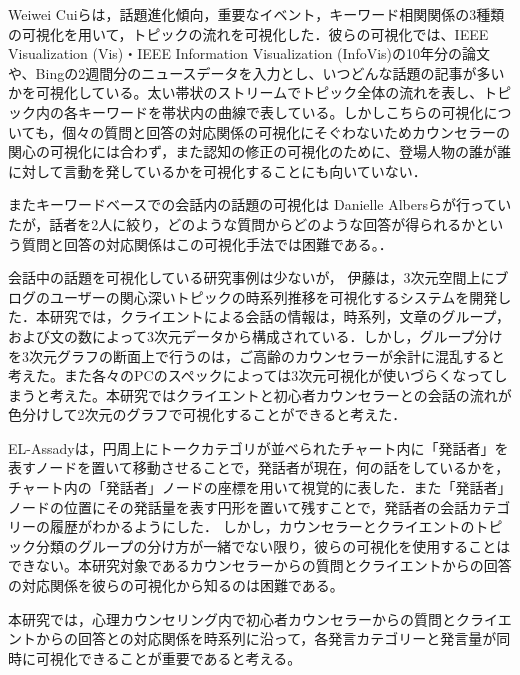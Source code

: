 \documentclass[shuuron]{kuee}
\begin{document}
Weiwei Cuiら\cite{cui2011textflow}は，話題進化傾向，重要なイベント，キーワード相関関係の3種類の可視化を用いて，トピックの流れを可視化した．彼らの可視化では、IEEE Visualization (Vis)・IEEE Information Visualization (InfoVis)の10年分の論文や、Bingの2週間分のニュースデータを入力とし、いつどんな話題の記事が多いかを可視化している。太い帯状のストリームでトピック全体の流れを表し、トピック内の各キーワードを帯状内の曲線で表している。しかしこちらの可視化についても，個々の質問と回答の対応関係の可視化にそぐわないためカウンセラーの関心の可視化には合わず，また認知の修正の可視化のために、登場人物の誰が誰に対して言動を発しているかを可視化することにも向いていない．

またキーワードベースでの会話内の話題の可視化は Danielle Albersら\cite{angus2012conceptual}が行っていたが，話者を2人に絞り，どのような質問からどのような回答が得られるかという質問と回答の対応関係はこの可視化手法では困難である。．%

会話中の話題を可視化している研究事例は少ないが，
伊藤\cite{itoh2010interactive}は，3次元空間上にブログのユーザーの関心深いトピックの時系列推移を可視化するシステムを開発した．本研究では，クライエントによる会話の情報は，時系列，文章のグループ，および文の数によって3次元データから構成されている．しかし，グループ分けを3次元グラフの断面上で行うのは，ご高齢のカウンセラーが余計に混乱すると考えた。また各々のPCのスペックによっては3次元可視化が使いづらくなってしまうと考えた。本研究ではクライエントと初心者カウンセラーとの会話の流れが色分けして2次元のグラフで可視化することができると考えた．%

EL-Assady\cite{el2016contovi}は，円周上にトークカテゴリが並べられたチャート内に「発話者」を表すノードを置いて移動させることで，発話者が現在，何の話をしているかを，チャート内の「発話者」ノードの座標を用いて視覚的に表した．また「発話者」ノードの位置にその発話量を表す円形を置いて残すことで，発話者の会話カテゴリーの履歴がわかるようにした．
しかし，カウンセラーとクライエントのトピック分類のグループの分け方が一緒でない限り，彼らの可視化を使用することはできない。本研究対象であるカウンセラーからの質問とクライエントからの回答の対応関係を彼らの可視化から知るのは困難である。

本研究では，心理カウンセリング内で初心者カウンセラーからの質問とクライエントからの回答との対応関係を時系列に沿って，各発言カテゴリーと発言量が同時に可視化できることが重要であると考える。
\end{document}
